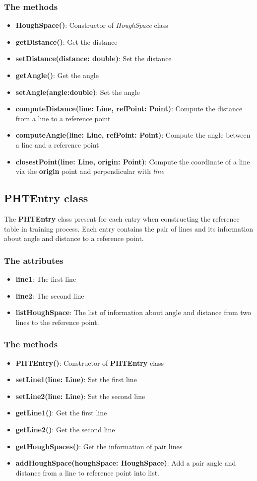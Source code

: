 \subsubsection{The methods}
\begin{itemize}
\item\textbf{HoughSpace()}: Constructor of \textit{HoughSpace} class
\item\textbf{getDistance()}: Get the distance
\item\textbf{setDistance(distance: double)}: Set the distance
\item\textbf{getAngle()}: Get the angle
\item\textbf{setAngle(angle:double)}: Set the angle
\item\textbf{computeDistance(line: Line, refPoint: Point)}: Compute the distance from a line to a reference point
\item\textbf{computeAngle(line: Line, refPoint: Point)}: Compute the angle between a line and a reference point
\item\textbf{closestPoint(line: Line, origin: Point)}: Compute the coordinate of a line via the \textbf{origin} point and perpendicular with \textit{line}
\end{itemize}
\subsection{PHTEntry class}
The \textbf{PHTEntry} class present for each entry when constructing the reference table in training process. Each entry contains the pair of lines and its information about angle and distance to a reference point.
\subsubsection{The attributes}
\begin{itemize}
\item\textbf{line1}: The first line
\item\textbf{line2}: The second line
\item\textbf{listHoughSpace}: The list of information about angle and distance from two lines to the reference point.
\end{itemize}
\subsubsection{The methods}
\begin{itemize}
\item\textbf{PHTEntry()}: Constructor of \textbf{PHTEntry} class
\item\textbf{setLine1(line: Line)}: Set the first line
\item\textbf{setLine2(line: Line)}: Set the second line
\item\textbf{getLine1()}: Get the first line
\item\textbf{getLine2()}: Get the second line
\item\textbf{getHoughSpaces()}: Get the information of pair lines
\item\textbf{addHoughSpace(houghSpace: HoughSpace)}: Add a pair angle and distance from a line to reference point into list.
\end{itemize}
